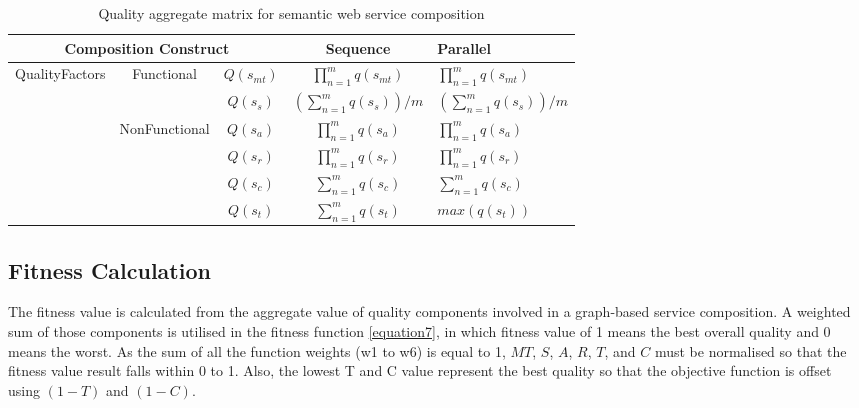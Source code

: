 \documentclass{llncs}
\begin{document}
\begin{table}[]
\centering
\caption{Quality aggregate matrix for semantic web service composition}
\label{table1}
\begin{tabular}{|c|c|c|c|l|}
\hline
\multicolumn{3}{|c|}{Composition Construct}                                      & Sequence                             & Parallel \\ \hline
\multirow{5}{*}{QualityFactors} & \multirow{2}{*}{Functional}    & $Q(s_ {mt})$  &$\prod_{n=1}^{m} q(s_ {mt})$          &  $\prod_{n=1}^{m} q(s_ {mt})$ \\ \cline{3-5}
                                &                                & $Q(s_ {s})$  & $(\sum_{n=1}^m q(s_ {s}))/m$        &  $(\sum_{n=1}^m q(s_ {s}))/m$  \\ \cline{2-5}   
                                & \multirow{4}{*}{NonFunctional} & $Q(s_{a})$    & $\prod_{n=1}^{m} q(s_a)$             &  $\prod_{n=1}^{m} q(s_a)$ \\ \cline{3-5} 
                                &                                & $Q(s_{r})$    & $\prod_{n=1}^{m} q(s_r)$             &  $\prod_{n=1}^{m} q(s_r)$ \\ \cline{3-5} 
                                &                                & $Q(s_{c})$    & $\sum_{n=1}^m q(s_ {c})$             &  $\sum_{n=1}^m q(s_ {c})$ \\ \cline{3-5} 
                                &                                & $Q(s_{t})$    & $\sum_{n=1}^m q(s_ {t})$             &  $max(q(s_ {t}))$ \\ \hline
\end{tabular}
\end{table}

\subsection{Fitness Calculation}
The fitness value is calculated from the aggregate value of quality components involved in a graph-based service composition. A weighted sum of those components is utilised in the fitness function \ref{equation7}, in which fitness value of 1 means the best overall quality and 0 means the worst. As the sum of all the function weights (w1 to w6) is equal to 1, $MT$, $S$, $A$, $R$, $T$, and $C$ must be normalised so that the fitness value result falls within 0 to 1. Also, the lowest T and C value represent the best quality so that the objective function is offset using $(1 - T)$ and $(1 - C)$.
\end{document}
